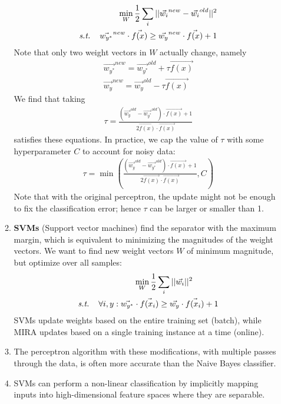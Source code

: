 \documentclass[10pt]{article}
\begin{document}
\begin{multicols}{2}
\begin{enumerate}
\begin{enumerate}
        \begin{align*}
            \min_{W} \frac{1}{2}\sum_{i} ||\vec{w_i}^{new}-\vec{w_i}^{old}||^2 \\ \textit{s.t.} \hspace{4mm} \vec{w_{y^*}}^{new} \cdot \vec{f(x)} \geq \vec{w_{y}}^{new} \cdot \vec{f(x)} + 1
        \end{align*}
        Note that only two weight vectors in $W$ actually change, namely
        \begin{align*}
            \vec{w_{y^*}}^{new} = \vec{w_{y^*}}^{old} + \tau \vec{f(x)} \\
            \vec{w_{y}}^{new} = \vec{w_{y}}^{old} - \tau \vec{f(x)} 
        \end{align*}
        We find that taking 
        \begin{align*}
            \tau = \frac{(\vec{w_{y}}^{old} - \vec{w_{y^*}}^{old}) \cdot \vec{f(x)}+1}{2\vec{f(x)} \cdot \vec{f(x)}}
        \end{align*}
        satisfies these equations. In practice, we cap the value of $\tau$ with some hyperparameter $C$ to account for noisy data:
        \begin{align*}
            \tau = \min\left( \frac{(\vec{w_{y}}^{old} - \vec{w_{y^*}}^{old}) \cdot \vec{f(x)}+1}{2\vec{f(x)} \cdot \vec{f(x)}}, C \right)
        \end{align*}
        Note that with the original perceptron, the update might not be enough to fix the classification error; hence $\tau$ can be larger or smaller than 1.
        \item \textbf{SVMs} (Support vector machines) find the separator with the maximum margin, which is equivalent to minimizing the magnitudes of the weight vectors. We want to find new weight vectors $W$ of minimum magnitude, but optimize over all samples:
        \begin{align*}
            &\min_{W} \frac{1}{2}\sum_{i} ||\vec{w_i}||^2 \\ \textit{s.t.} \hspace{4mm} \forall i, y: \vec{w_{y^*}} &\cdot \vec{f(x_i)} \geq \vec{w_{y}} \cdot \vec{f(x_i)} + 1
        \end{align*}
        SVMs update weights based on the entire training set (batch), while MIRA updates based on a single training instance at a time (online).
        \item The perceptron algorithm with these modifications, with multiple passes through the data, is often more accurate than the Naive Bayes classifier.
        \item SVMs can perform a non-linear classification by implicitly mapping inputs into high-dimensional feature spaces where they are separable.
    \end{enumerate}

\end{enumerate}
\end{multicols}
\end{document}
